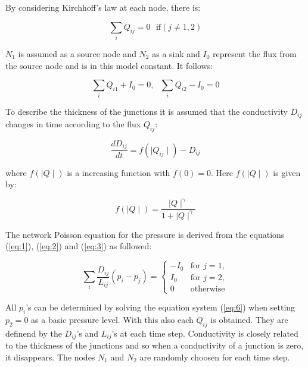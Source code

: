 \documentclass[11pt]{scrartcl}
\begin{document}
By considering Kirchhoff's law at each node, there is:

\begin{equation}
	\label{eq:2}
	\sum_{i} Q_{ij}=0 \,\,\,\, \mathrm{if} \left(j\ne 1,2\right)
\end{equation}

$N_1$ is assumed as a source node and $N_2$ as a sink and $I_0$ represent the flux from the source node and is in this model constant. It follows:

\begin{equation}
	\label{eq:3}
	\sum_{i} Q_{i1}+I_0=0, \,\,\,\, \sum_{i} Q_{i2}-I_0=0
\end{equation}

To describe the thickness of the junctions it is assumed that the conductivity $D_{ij}$ changes in time according to the flux $Q_{ij}$:

\begin{equation}
	\label{eq:4}
	\frac{dD_{ij}}{dt}=f\left(\mid Q_{ij} \mid \right)-D_{ij}
\end{equation}

where $f\left(\mid Q \mid \right)$ is a increasing function with $f(0)=0$. Here $f\left(\mid Q \mid \right)$ is given by:

\begin{equation}
	\label{eq:5}
	f\left(\mid Q \mid \right)=\frac{\mid Q \mid^\gamma }{1+\mid Q \mid^\gamma}
\end{equation}

The network Poisson equation for the pressure is derived from the equations (\ref{eq:1}), (\ref{eq:2}) and (\ref{eq:3}) as followed:

\begin{equation}
	\label{eq:6}
	\sum_{i} \frac{D_{ij}}{L_{ij}}\left(p_i-p_j\right)= \begin{cases}
										-I_0 & \mathrm{for}\,\, j=1,\\
										I_0 & \mathrm{for} \,\,j=2,\\
										0 & \mathrm{otherwise}
										\end{cases}
\end{equation}

All $p_i$'s can be determined by solving the equation system (\ref{eq:6}) when setting $p_2=0$ as a basic pressure level. With this also each $Q_{ij}$ is obtained. They are definend by the $D_{ij}$'s and $L_{ij}$'s  at each time step. Conductivity is closely related to the thickness of the junctions and so when a conductivity of a junction is zero, it disappears. The nodes $N_1$ and $N_2$ are randomly choosen for each time step.
\end{document}
